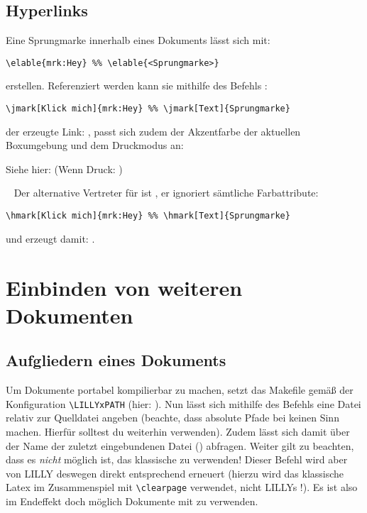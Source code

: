 \subsection{Hyperlinks}
Eine Sprungmarke innerhalb eines Dokuments lässt sich mit:
\begin{lstlisting}[language=lLatex]
\elable{mrk:Hey} %% \elable{<Sprungmarke>}
\end{lstlisting}
erstellen. Referenziert werden kann sie mithilfe des Befehls :
\begin{lstlisting}[language=lLatex]
\jmark[Klick mich]{mrk:Hey} %% \jmark[Text]{Sprungmarke}
\end{lstlisting}
der erzeugte Link: , passt sich zudem der Akzentfarbe der aktuellen Boxumgebung und dem Druckmodus an:\smallskip
\begin{zusammenfassung}[Testzusammenfassung]
Siehe hier:  (Wenn Druck: )
\end{zusammenfassung}~\smallskip\newline
Der alternative Vertreter für  ist , er ignoriert sämtliche Farbattribute:
\begin{lstlisting}[language=lLatex]
\hmark[Klick mich]{mrk:Hey} %% \hmark[Text]{Sprungmarke}
\end{lstlisting}
und erzeugt damit: .





\section{Einbinden von weiteren Dokumenten}
\subsection{Aufgliedern eines Dokuments}
Um Dokumente portabel kompilierbar zu machen, setzt das Makefile gemäß der Konfiguration \verb|\LILLYxPATH| (hier: \say{\T{\LILLYxPATH}}). Nun lässt sich mithilfe des Befehls  eine Datei relativ zur Quelldatei angeben (beachte, dass absolute Pfade bei  keinen Sinn machen. Hierfür solltest du weiterhin \verb|| verwenden).\newline
Zudem lässt sich damit über  der Name der zuletzt eingebundenen Datei (\T{\LILLYxDOCUMENTxSUBNAME}) abfragen.\newline
{}Weiter gilt zu beachten, dass es \emph{nicht} möglich ist, das klassische \verb|| zu verwenden! Dieser Befehl wird aber von LILLY deswegen direkt entsprechend erneuert (hierzu wird das klassische Latex \verb|| im Zusammenspiel mit \verb|\clearpage| verwendet, nicht LILLYs !). Es ist also im Endeffekt doch möglich Dokumente mit \verb||
zu verwenden.




